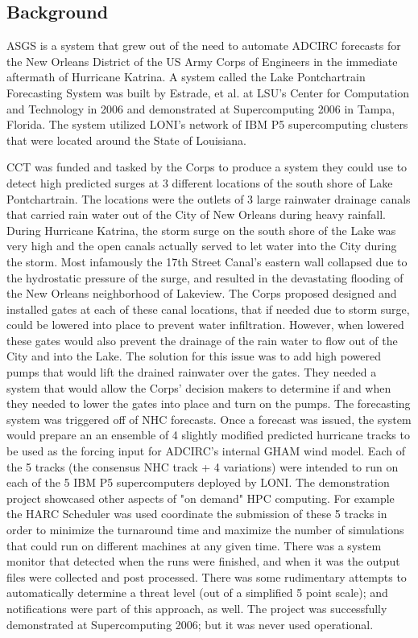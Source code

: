 \documentclass{article}
\begin{document}
\subsection{Background}

ASGS is a system that grew out of the need to automate ADCIRC forecasts for the
New Orleans District of the US Army Corps of Engineers in the immediate
aftermath of Hurricane Katrina. A system called the Lake Pontchartrain
Forecasting System was built by Estrade, et al.\cite{} at LSU's Center for
Computation and Technology in 2006 and demonstrated at Supercomputing 2006 in
Tampa, Florida. The system utilized LONI's network of IBM P5 supercomputing
clusters that were located around the State of Louisiana.

CCT was funded and tasked by the Corps to produce a system they could use to
detect high predicted surges at 3 different locations of the south shore of Lake
Pontchartrain. The locations were the outlets of 3 large rainwater drainage
canals that carried rain water out of the City of New Orleans during heavy
rainfall. During Hurricane Katrina, the storm surge on the south shore of the
Lake was very high and the open canals actually served to let water into the
City during the storm. Most infamously the 17th Street Canal's eastern wall
collapsed due to the hydrostatic pressure of the surge, and resulted in the
devastating flooding of the New Orleans neighborhood of Lakeview.  The Corps
proposed designed and installed gates at each of these canal locations, that if
needed due to storm surge, could be lowered into place to prevent water
infiltration. However, when lowered these gates would also prevent the drainage
of the rain water to flow out of the City and into the Lake. The solution for
this issue was to add high powered pumps that would lift the drained rainwater
over the gates. They needed a system that would allow the Corps' decision makers
to determine if and when they needed to lower the gates into place and turn on
the pumps.  The forecasting system was triggered off of NHC forecasts. Once a
forecast was issued, the system would prepare an an ensemble of 4 slightly
modified predicted hurricane tracks to be used as the forcing input for ADCIRC's
internal GHAM wind model. Each of the 5 tracks (the consensus NHC track + 4
variations) were intended to run on each of the 5 IBM P5 supercomputers deployed
by LONI.  The demonstration project showcased other aspects of "on demand" HPC
computing. For example the HARC Scheduler\cite{} was used coordinate the
submission of these 5 tracks in order to minimize the turnaround time and
maximize the number of simulations that could run on different machines at any
given time. There was a system monitor that detected when the runs were
finished, and when it was the output files were collected and post processed.
There was some rudimentary attempts to automatically determine a threat level
(out of a simplified 5 point scale); and notifications were part of this
approach, as well. The project was successfully demonstrated at Supercomputing
2006; but it was never used operational.
\end{document}

